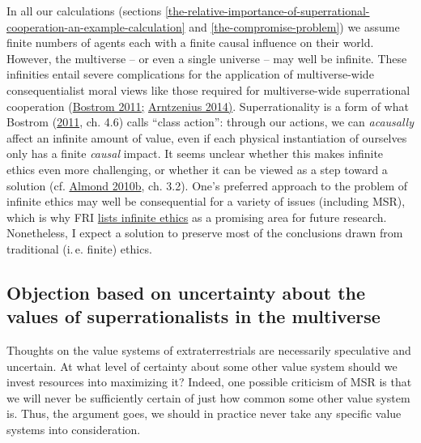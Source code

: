 In all our calculations (sections
\ref{the-relative-importance-of-superrational-cooperation-an-example-calculation}
and \ref{the-compromise-problem})
we assume finite
numbers of agents each with a finite causal influence on their world. However, the multiverse -- or
even a single universe -- may well be infinite. These infinities entail severe complications for the
application of multiverse-wide consequentialist moral views like those required for
multiverse-wide superrational cooperation
(\href{http://www.nickbostrom.com/ethics/infinite.pdf}{Bostrom
2011;}
\href{http://lukemuehlhauser.com/wp-content/uploads/Arntzenius-Utilitarianism-decision-theory-and-eternity.pdf}{Arntzenius
2014)}. Superrationality is a form of what Bostrom
(\href{http://www.nickbostrom.com/ethics/infinite.pdf}{2011}, ch.
4.6) calls ``class action'': through our actions, we can
\emph{acausally} affect an infinite amount of value, even if each
physical instantiation of ourselves only has a finite \emph{causal}
impact. It seems unclear whether this makes infinite ethics even more
challenging, or whether it can be viewed as a step toward a solution
(cf.
\href{https://web.archive.org/web/20120310010225/http://www.paul-almond.com/Correlation2.pdf}{Almond
2010b}, ch. 3.2). One's preferred approach to the problem of infinite
ethics may well be consequential for a variety of issues (including
MSR), which is why FRI
\href{https://foundational-research.org/infinity-in-ethics/}{lists
infinite ethics} as a promising area for future research. Nonetheless,
I expect a solution to preserve most of the conclusions drawn from
traditional (i.\,e. finite) ethics.

\hypertarget{objection-based-on-uncertainty-about-the-values-of-superrationalists-in-the-multiverse}{\subsection{Objection
based on uncertainty about the values of superrationalists in the
multiverse}\label{objection-based-on-uncertainty-about-the-values-of-superrationalists-in-the-multiverse}}

Thoughts on the value systems of extraterrestrials are necessarily
speculative and uncertain. At what level of certainty about some other
value system should we invest resources into maximizing it? Indeed, one
possible criticism of MSR is that we will never be sufficiently certain
of just how common some other value system is. Thus, the argument goes,
we should in practice never take any specific value systems into
consideration.

